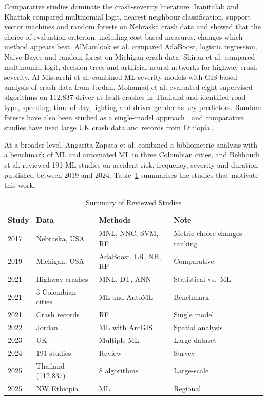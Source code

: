 \documentclass[conference]{IEEEtran}
\begin{document}
Comparative studies dominate the crash-severity literature. Iranitalab and Khattak \cite{iranitalab2017} compared multinomial logit, nearest neighbour classification, support vector machines and random forests on Nebraska crash data and showed that the choice of evaluation criterion, including cost-based measures, changes which method appears best. AlMamlook et al. \cite{almamlook2019} compared AdaBoost, logistic regression, Naive Bayes and random forest on Michigan crash data. Shiran et al. \cite{shiran2021} compared multinomial logit, decision trees and artificial neural networks for highway crash severity. Al-Mistarehi et al. \cite{almistarehi2022} combined ML severity models with GIS-based analysis of crash data from Jordan. Mohamad et al. \cite{mohamad2025} evaluated eight supervised algorithms on 112,837 driver-at-fault crashes in Thailand and identified road type, speeding, time of day, lighting and driver gender as key predictors. Random forests have also been studied as a single-model approach \cite{hoanglong2021}, and comparative studies have used large UK crash data \cite{vanitha2023} and records from Ethiopia \cite{ethiopia2025}.

At a broader level, Angarita-Zapata et al. \cite{angarita2021} combined a bibliometric analysis with a benchmark of ML and automated ML in three Colombian cities, and Behboudi et al. \cite{behboudi2024} reviewed 191 ML studies on accident risk, frequency, severity and duration published between 2019 and 2024. Table~\ref{tab:reviewed} summarises the studies that motivate this work.

\begin{table}[t]
\caption{Summary of Reviewed Studies}
\label{tab:reviewed}
\centering
\footnotesize
\begin{tabular}{@{}p{0.9cm}p{1.9cm}p{2.3cm}p{2.3cm}@{}}
\toprule
Study & Data & Methods & Note \\
\midrule
\cite{iranitalab2017} 2017 & Nebraska, USA & MNL, NNC, SVM, RF & Metric choice changes ranking \\
\cite{almamlook2019} 2019 & Michigan, USA & AdaBoost, LR, NB, RF & Comparative \\
\cite{shiran2021} 2021 & Highway crashes & MNL, DT, ANN & Statistical vs.\ ML \\
\cite{angarita2021} 2021 & 3 Colombian cities & ML and AutoML & Benchmark \\
\cite{hoanglong2021} 2021 & Crash records & RF & Single model \\
\cite{almistarehi2022} 2022 & Jordan & ML with ArcGIS & Spatial analysis \\
\cite{vanitha2023} 2023 & UK & Multiple ML & Large dataset \\
\cite{behboudi2024} 2024 & 191 studies & Review & Survey \\
\cite{mohamad2025} 2025 & Thailand (112,837) & 8 algorithms & Large-scale \\
\cite{ethiopia2025} 2025 & NW Ethiopia & ML & Regional \\
\bottomrule
\end{tabular}
\end{table}
\end{document}
